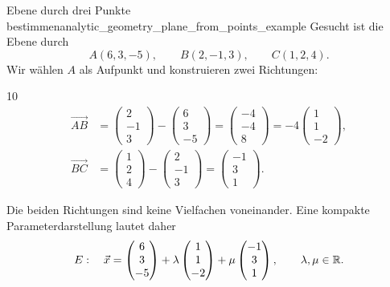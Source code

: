 \begin{ExampleBox}{Ebene durch drei Punkte bestimmen}{analytic_geometry_plane_from_points_example}
  Gesucht ist die Ebene durch
  \[
    A(6,3,-5),\qquad B(2,-1,3),\qquad C(1,2,4).
  \]
  Wir wählen $A$ als Aufpunkt und konstruieren zwei Richtungen:
  \begin{ClozeArea}[34]{10}
    \[
      \begin{aligned}
        \overrightarrow{AB}
          &=\begin{pmatrix}2\\-1\\3\end{pmatrix}
            -\begin{pmatrix}6\\3\\-5\end{pmatrix}
            =\begin{pmatrix}-4\\-4\\8\end{pmatrix}
            =-4\begin{pmatrix}1\\1\\-2\end{pmatrix},\\[1em]
        \overrightarrow{BC}
          &=\begin{pmatrix}1\\2\\4\end{pmatrix}
            -\begin{pmatrix}2\\-1\\3\end{pmatrix}
            =\begin{pmatrix}-1\\3\\1\end{pmatrix}.
      \end{aligned}
    \]
  \end{ClozeArea}
  Die beiden Richtungen sind keine Vielfachen voneinander. Eine kompakte
  Parameterdarstellung lautet daher
  \[
    E:\quad
    \vec x
    =\begin{pmatrix}6\\3\\-5\end{pmatrix}
    +\lambda\begin{pmatrix}1\\1\\-2\end{pmatrix}
    +\mu\begin{pmatrix}-1\\3\\1\end{pmatrix},
    \qquad \lambda,\mu\in\mathbb{R}.
  \]
\end{ExampleBox}
